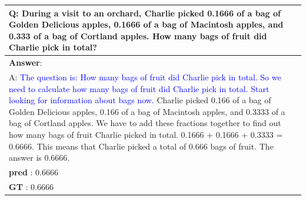 \documentclass[11pt]{article}
\begin{document}
\begin{table}[!h]
\begin{tabularx}{\textwidth}{X}
Q: During a visit to an orchard, Charlie picked 0.1666 of a bag of Golden Delicious apples, 0.1666 of a bag of Macintosh apples, and 0.333 of a bag of Cortland apples. How many bags of fruit did Charlie pick in total?\\
        \midrule
\textbf{Answer}:\\
A:
\textcolor{blue}{ The question is: How many bags of fruit did Charlie pick in total. So we need to calculate how many bags of fruit did Charlie pick in total. Start looking for information about bags now.} Charlie picked 0.166 of a bag of Golden Delicious apples, 0.166 of a bag of Macintosh apples, and 0.3333 of a bag of Cortland apples. We have to add these fractions together to find out how many bags of fruit Charlie picked in total. 0.1666 + 0.1666 + 0.3333 = 0.6666. This means that Charlie picked a total of 0.666 bags of fruit. The answer is 0.6666.\\
\textbf{pred} : 0.6666\\
\textbf{GT} : 0.6666\\
    \bottomrule

\end{tabularx}
\end{table}
\end{document}
